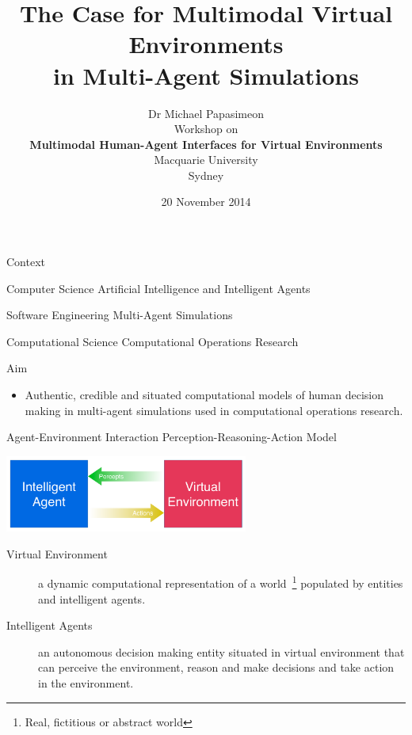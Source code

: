 \documentclass[xcolor=dvipsnames,t]{beamer}
\title[Multimodal Virtual Environments]{The Case for Multimodal Virtual
Environments\\ in Multi-Agent Simulations}
\author[Michael Papasimeon]{Dr Michael Papasimeon \\[0.2in] 
                Workshop on\\ 
                \textbf{Multimodal Human-Agent Interfaces for Virtual Environments} \\[0.2in] 
                Macquarie University\\
                Sydney\\}
\date{20 November 2014}
\begin{document}
\begin{frame}
    \titlepage
\end{frame} 

\begin{frame}{Context} 

    \begin{block}{Computer Science} 
    Artificial Intelligence and Intelligent Agents 
    \end{block}

    \begin{block}{Software Engineering} 
    Multi-Agent Simulations
    \end{block} 

    \begin{block}{Computational Science} 
    Computational Operations Research
    \end{block} 
\pause
    \begin{exampleblock}{Aim} 
        \begin{itemize}
            \item Authentic, credible and situated computational models of human decision
            making in multi-agent simulations used in computational operations
            research. 
        \end{itemize} 
    \end{exampleblock} 

\end{frame} 

\begin{frame}{Agent-Environment Interaction} 
    Perception-Reasoning-Action Model 
    \begin{center}
        \includegraphics[width=8cm]{agent-env} 
    \end{center} 

    \begin{description}
        \item[Virtual Environment] a dynamic computational representation of a
        world~\footnote{Real, fictitious or abstract world} 
        populated by entities and intelligent agents. 
        \item[Intelligent Agents] an autonomous decision making entity situated
        in virtual environment that can perceive the environment, reason and
        make decisions and take action in the environment.  
    \end{description} 
\end{frame} 
\end{document}
